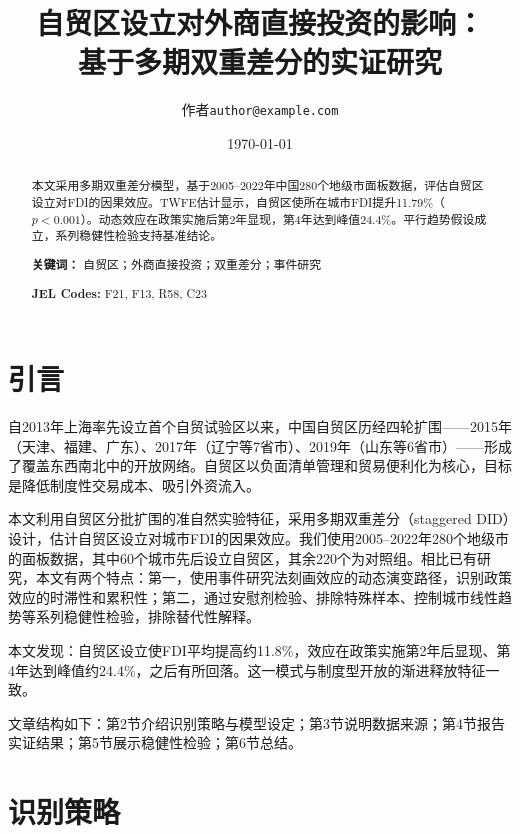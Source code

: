 \documentclass[12pt,a4paper]{article}
\title{\textbf{自贸区设立对外商直接投资的影响：\\基于多期双重差分的实证研究}}
\author{作者\quad\texttt{author@example.com}}
\date{\today}
\begin{document}
\maketitle
\thispagestyle{empty}

\begin{abstract}
\noindent 本文采用多期双重差分模型，基于2005--2022年中国280个地级市面板数据，评估自贸区设立对FDI的因果效应。TWFE估计显示，自贸区使所在城市FDI提升11.79\%（$p<0.001$）。动态效应在政策实施后第2年显现，第4年达到峰值24.4\%。平行趋势假设成立，系列稳健性检验支持基准结论。

\vspace{0.5cm}
\noindent \textbf{关键词：} 自贸区；外商直接投资；双重差分；事件研究

\vspace{0.3cm}
\noindent \textbf{JEL Codes:} F21, F13, R58, C23
\end{abstract}

\newpage
\setcounter{page}{1}

\section{引言}

自2013年上海率先设立首个自贸试验区以来，中国自贸区历经四轮扩围——2015年（天津、福建、广东）、2017年（辽宁等7省市）、2019年（山东等6省市）——形成了覆盖东西南北中的开放网络。自贸区以负面清单管理和贸易便利化为核心，目标是降低制度性交易成本、吸引外资流入。

本文利用自贸区分批扩围的准自然实验特征，采用多期双重差分（staggered DID）设计，估计自贸区设立对城市FDI的因果效应。我们使用2005--2022年280个地级市的面板数据，其中60个城市先后设立自贸区，其余220个为对照组。相比已有研究，本文有两个特点：第一，使用事件研究法刻画效应的动态演变路径，识别政策效应的时滞性和累积性；第二，通过安慰剂检验、排除特殊样本、控制城市线性趋势等系列稳健性检验，排除替代性解释。

本文发现：自贸区设立使FDI平均提高约11.8\%，效应在政策实施第2年后显现、第4年达到峰值约24.4\%，之后有所回落。这一模式与制度型开放的渐进释放特征一致。

文章结构如下：第2节介绍识别策略与模型设定；第3节说明数据来源；第4节报告实证结果；第5节展示稳健性检验；第6节总结。

\section{识别策略}
\end{document}
